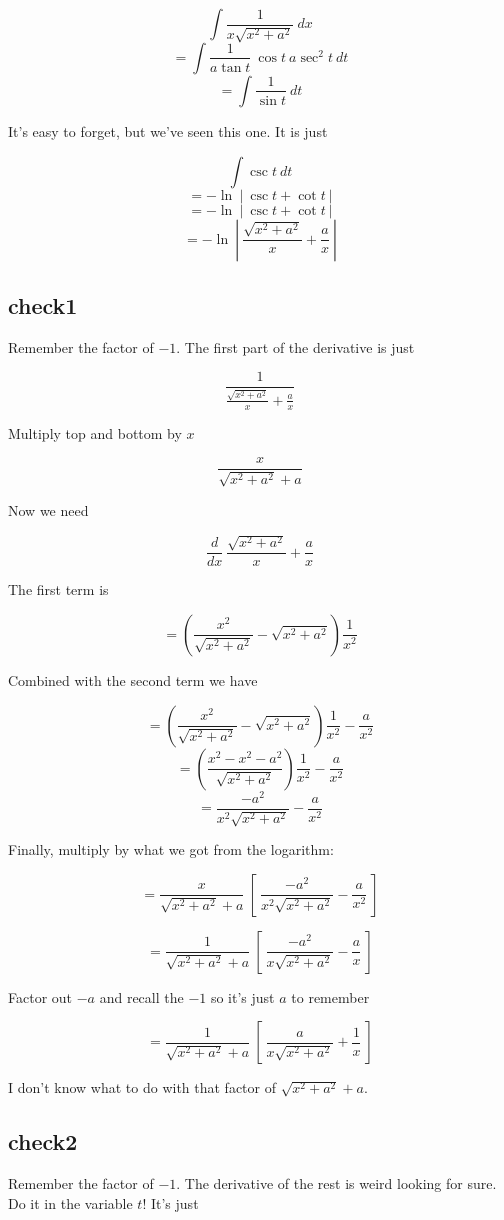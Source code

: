 \documentclass[11pt, oneside]{article}
\begin{document}
\[ \int \frac{1}{x \sqrt{x^2 + a^2}} \ dx \]
\[ = \int \frac{1}{a \tan t} \ \cos t \ a \sec^2 t \ dt \]
\[ = \int \frac{1}{\sin t} \ dt \]

It's easy to forget, but we've seen this one.  It is just

\[ \int \csc t \ dt \]
\[ = - \ln \ | \ \csc t + \cot t \ | \]
\[ = - \ln \ | \ \csc t + \cot t \ | \]
\[ = - \ln \ | \ \frac{\sqrt{x^2 + a^2}}{x} + \frac{a}{x} \ | \]

\subsection*{check1}

Remember the factor of $-1$.  The first part of the derivative is just

\[ \frac{1}{\frac{\sqrt{x^2 + a^2}}{x} + \frac{a}{x}} \]

Multiply top and bottom by $x$

\[ \frac{x}{\sqrt{x^2 + a^2} + a} \]

Now we need

\[ \frac{d}{dx} \ \frac{\sqrt{x^2 + a^2}}{x} + \frac{a}{x} \]

The first term is

\[ = (\frac{x^2}{\sqrt{x^2 + a^2}} - \sqrt{x^2 + a^2} )  \frac{1}{x^2} \]

Combined with the second term we have

\[ = (\frac{x^2}{\sqrt{x^2 + a^2}} - \sqrt{x^2 + a^2} )  \frac{1}{x^2} -\frac{a}{x^2} \]
\[ = (\frac{x^2 - x^2 - a^2}{\sqrt{x^2 + a^2}})  \frac{1}{x^2} -\frac{a}{x^2} \]
\[ = \frac{-a^2}{x^2 \sqrt{x^2 + a^2}} - \frac{a}{x^2} \]

Finally, multiply by what we got from the logarithm:

\[ = \frac{x}{\sqrt{x^2 + a^2} + a} \ [ \ \frac{-a^2}{x^2 \sqrt{x^2 + a^2}} - \frac{a}{x^2} \ ]  \]

\[ = \frac{1}{\sqrt{x^2 + a^2} + a} \ [ \ \frac{-a^2}{x \sqrt{x^2 + a^2}} - \frac{a}{x} \ ]  \]

Factor out $-a$ and recall the $-1$ so it's just $a$ to remember

\[ = \frac{1}{\sqrt{x^2 + a^2} + a} \ [ \ \frac{a}{x \sqrt{x^2 + a^2}} + \frac{1}{x} \ ]  \]

I don't know what to do with that factor of $\sqrt{x^2 + a^2} + a$.

\subsection*{check2}
Remember the factor of $-1$.  The derivative of the rest is weird looking for sure.  Do it in the variable $t$!  It's just
\end{document}

